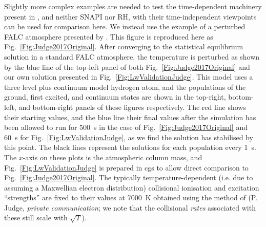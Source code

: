 Slightly more complex examples are needed to test the time-dependent machinery present in \Lw{}, and neither SNAPI nor RH, with their time-independent viewpoints can be used for comparison here.
We instead use the example of a perturbed FALC atmosphere presented by \citet{Judge2017}.
This figure is reproduced here as Fig.~\ref{Fig:Judge2017Original}.
After converging to the statistical equilibrium solution in a standard FALC atmosphere, the temperature is perturbed as shown by the blue line of the top-left panel of both Fig.~\ref{Fig:Judge2017Original} and our own solution presented in Fig.~\ref{Fig:LwValidationJudge}.
This model uses a three level plus continuum model hydrogen atom, and the populations of the ground, first excited, and continuum states are shown in the top-right, bottom-left, and bottom-right panels of these figures respectively.
The red line shows their starting values, and the blue line their final values after the simulation has been allowed to run for \SI{500}{\second} in the case of Fig.~\ref{Fig:Judge2017Original} and \SI{60}{\second} for Fig.~\ref{Fig:LwValidationJudge}, as we find the solution has stabilised by this point.
The black lines represent the solutions for each population every \SI{1}{\second}.
The $x$-axis on these plots is the atmospheric column mass, and Fig.~\ref{Fig:LwValidationJudge} is prepared in cgs to allow direct comparison to Fig.~\ref{Fig:Judge2017Original}.
The typically temperature-dependent (i.e. due to assuming a Maxwellian electron distribution) collisional ionisation and excitation ``strengths'' are fixed to their values at \SI{7000}{\kelvin} obtained using the method of \citet{Johnson1972} (P. Judge, \emph{private communication}; we note that the collisional \emph{rates} associated with these still scale with $\sqrt{T}$).


